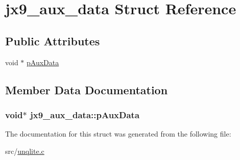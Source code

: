 \hypertarget{structjx9__aux__data}{\section{jx9\-\_\-aux\-\_\-data Struct Reference}
\label{d1/d64/structjx9__aux__data}
}
\subsection*{Public Attributes}
\begin{DoxyCompactItemize}
\item 
void $\ast$ \hyperlink{structjx9__aux__data_a13d97e8fa055876ea8a71d849d9c91ef}{p\-Aux\-Data}
\end{DoxyCompactItemize}


\subsection{Member Data Documentation}
\hypertarget{structjx9__aux__data_a13d97e8fa055876ea8a71d849d9c91ef}{
\subsubsection[{p\-Aux\-Data}]{\setlength{\rightskip}{0pt plus 5cm}void$\ast$ jx9\-\_\-aux\-\_\-data\-::p\-Aux\-Data}}\label{d1/d64/structjx9__aux__data_a13d97e8fa055876ea8a71d849d9c91ef}


The documentation for this struct was generated from the following file\-:\begin{DoxyCompactItemize}
\item 
src/\hyperlink{unqlite_8c}{unqlite.\-c}\end{DoxyCompactItemize}
